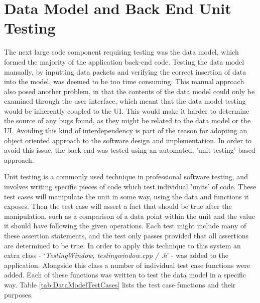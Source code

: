 \section{Data Model and Back End Unit Testing} \label{BackEndUnitTesting}
The next large code component requiring testing was the data model, which formed the majority of the application back-end code. Testing the data model manually, by inputting data packets and verifying the correct insertion of data into the model, was deemed to be too time consuming. This manual approach also posed another problem, in that the contents of the data model could only be examined through the user interface, which meant that the data model testing would be inherently coupled to the UI. This would make it harder to determine the source of any bugs found, as they might be related to the data model or the UI. Avoiding this kind of interdependency is part of the reason for adopting an object oriented approach to the software design and implementation. In order to avoid this issue, the back-end was tested using an automated, 'unit-testing' based approach.

Unit testing is a commonly used technique in professional software testing, and involves writing specific pieces of code which test individual 'units' of code. These test cases will manipulate the unit in some way, using the data and functions it exposes. Then the test case will assert a fact that should be true after the manipulation, such as a comparison of a data point within the unit and the value it should have following the given operations. Each test might include many of these assertion statements, and the test only passes provided that all assertions are determined to be true. In order to apply this technique to this system an extra class - `\textit{TestingWindow, testingwindow.cpp / .h}' - was added to the application. Alongside this class a number of individual test case functions were added. Each of these functions was written to test the data model in a specific way. Table \ref{tab:DataModelTestCases} lists the test case functions and their purposes.


